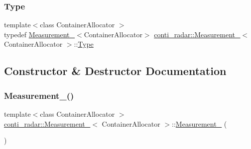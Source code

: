 \subsubsection{\texorpdfstring{Type}{Type}}
{\footnotesize\ttfamily template$<$class Container\+Allocator $>$ \\
typedef \hyperlink{structconti__radar_1_1Measurement__}{Measurement\+\_\+}$<$Container\+Allocator$>$ \hyperlink{structconti__radar_1_1Measurement__}{conti\+\_\+radar\+::\+Measurement\+\_\+}$<$ Container\+Allocator $>$\+::\hyperlink{structconti__radar_1_1Measurement___a2200a2a7e732e715ac1630d6a4dccdab}{Type}}



\subsection{Constructor \& Destructor Documentation}
\mbox{\label{structconti__radar_1_1Measurement___ae3409c1795ff01663ac93d3685718096}} 
\subsubsection{\texorpdfstring{Measurement\+\_\+()}{Measurement\_()}\hspace{0.1cm}{\footnotesize\ttfamily [1/2]}}
{\footnotesize\ttfamily template$<$class Container\+Allocator $>$ \\
\hyperlink{structconti__radar_1_1Measurement__}{conti\+\_\+radar\+::\+Measurement\+\_\+}$<$ Container\+Allocator $>$\+::\hyperlink{structconti__radar_1_1Measurement__}{Measurement\+\_\+} (\begin{DoxyParamCaption}{ }\end{DoxyParamCaption})\hspace{0.3cm}{\ttfamily [inline]}}

\mbox{\label{structconti__radar_1_1Measurement___a2dcfbe1222ec67ece03561b101705b66}} 
